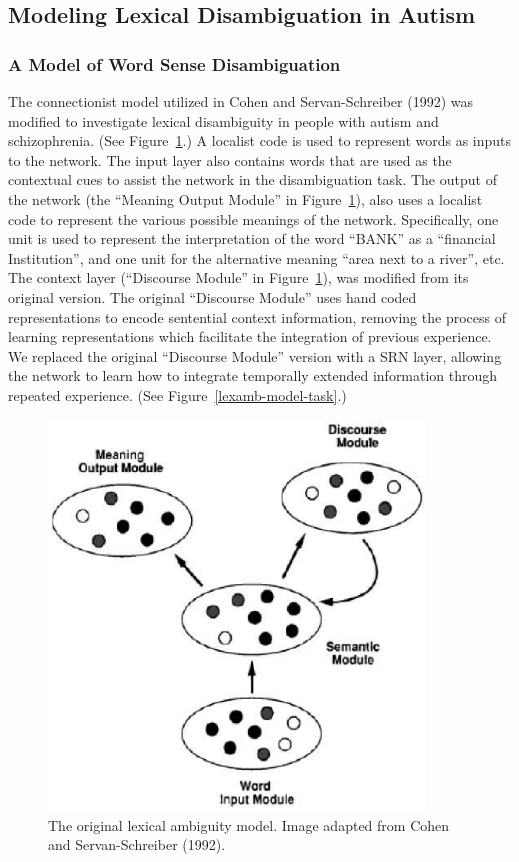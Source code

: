 \subsection{Modeling Lexical Disambiguation in Autism}

\subsubsection{A Model of Word Sense Disambiguation}
The connectionist model utilized in Cohen and Servan-Schreiber (1992) was modified to investigate lexical disambiguity in people with autism and schizophrenia. (See Figure~\ref{cohen-servan-schreiber-model}.)  A localist code is used to represent words as inputs to the network.  The input layer also contains words that are used as the contextual cues to assist the network in the disambiguation task.  The output of the network (the ``Meaning Output Module'' in Figure~\ref{cohen-servan-schreiber-model}), also uses a localist code to represent the various possible meanings of the network.  Specifically, one unit is used to represent the interpretation of the word ``BANK'' as a ``financial Institution'', and one unit for the alternative meaning ``area next to a river'', etc.  The context layer (``Discourse Module'' in Figure~\ref{cohen-servan-schreiber-model}), was modified from its original version.  The original ``Discourse Module'' uses hand coded representations to encode sentential context information, removing the process of learning representations which facilitate the integration of previous experience.  We replaced the original ``Discourse Module'' version with a SRN layer, allowing the network to learn how to integrate temporally extended information through repeated experience. (See Figure~\ref{lexamb-model-task}.) 

\begin{figure}[tp]
\begin{center}
	\includegraphics[width=100mm]{figures/Cohen_ServanSchreiber_Model.eps}
\end{center}
\caption{The original lexical ambiguity model. Image adapted from Cohen and Servan-Schreiber (1992).}
\label{cohen-servan-schreiber-model}
\end{figure} 

